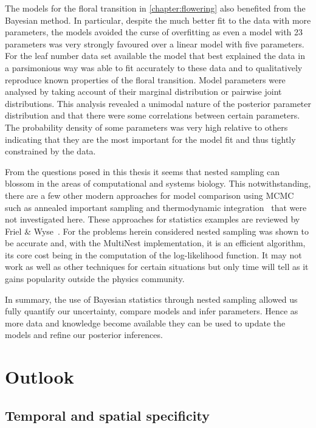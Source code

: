 The models for the floral transition in \autoref{chapter:flowering} also benefited from the Bayesian method.
In particular, despite the much better fit to the data with more parameters, the models avoided the curse of overfitting as even a model with 23 parameters was very strongly favoured over a linear model with five parameters.
For the leaf number data set available the model that best explained the data in a parsimonious way was able to fit accurately to these data and to qualitatively reproduce known properties of the floral transition.
Model parameters were analysed by taking account of their marginal distribution or pairwise joint distributions.
This analysis revealed a unimodal nature of the posterior parameter distribution and that there were some correlations between certain parameters.
The probability density of some parameters was very high relative to others indicating that they are the most important for the model fit and thus tightly constrained by the data.

From the questions posed in this thesis it seems that nested sampling can blossom in the areas of computational and systems biology.
This notwithstanding, there are a few other modern approaches for model comparison using MCMC such as annealed important sampling and thermodynamic integration~\cite{murray2007, calderhead2009, lartillot2006, vyshemirsky2008} that were not investigated here.
These approaches for statistics examples are reviewed by Friel \& Wyse~\cite{friel2012}.
For the problems herein considered nested sampling was shown to be accurate and, with the MultiNest implementation, it is an efficient algorithm, its core cost being in the computation of the log-likelihood function.
It may not work as well as other techniques for certain situations but only time will tell as it gains popularity outside the physics community.

In summary, the use of Bayesian statistics through nested sampling allowed us fully quantify our uncertainty, compare models and infer parameters.
Hence as more data and knowledge become available they can be used to update the models and refine our posterior inferences.

\section{Outlook}
\subsection{Temporal and spatial specificity}


